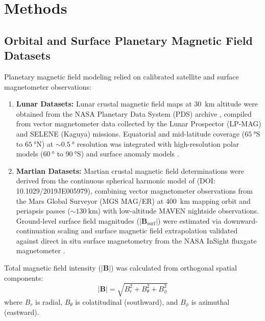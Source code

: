 \section{Methods}
\label{sec:methods}

\subsection{Orbital and Surface Planetary Magnetic Field Datasets}
Planetary magnetic field modeling relied on calibrated satellite and surface magnetometer observations:
\begin{enumerate}
    \item \textbf{Lunar Datasets:} Lunar crustal magnetic field maps at \SI{30}{\kilo\meter} altitude were obtained from the NASA Planetary Data System (PDS) archive \citep{Hood2020, Hood2022}, compiled from vector magnetometer data collected by the Lunar Prospector (LP-MAG) and SELENE (Kaguya) missions. Equatorial and mid-latitude coverage ($\SI{65}{\degree}\text{S}$ to $\SI{65}{\degree}\text{N}$) at $\sim\SI{0.5}{\degree}$ resolution was integrated with high-resolution polar models ($\SI{60}{\degree}$ to $\SI{90}{\degree}\text{S}$) \citep{Hood2022} and surface anomaly models \citep{Tsunakawa2015}.
    \item \textbf{Martian Datasets:} Martian crustal magnetic field determinations were derived from the continuous spherical harmonic model of \citet{Langlais2019} (DOI: 10.1029/2019JE005979), combining vector magnetometer observations from the Mars Global Surveyor (MGS MAG/ER) at \SI{400}{\kilo\meter} mapping orbit and periapsis passes ($\sim\SI{130}{\kilo\meter}$) with low-altitude MAVEN nightside observations. Ground-level surface field magnitudes ($|\mathbf{B}_{\text{surf}}|$) were estimated via downward-continuation scaling and surface magnetic field extrapolation validated against direct in situ surface magnetometry from the NASA InSight fluxgate magnetometer \citep{Johnson2020}.
\end{enumerate}

Total magnetic field intensity ($|\mathbf{B}|$) was calculated from orthogonal spatial components:
\begin{equation}
|\mathbf{B}| = \sqrt{B_r^2 + B_\theta^2 + B_\phi^2}
\end{equation}
where $B_r$ is radial, $B_\theta$ is colatitudinal (southward), and $B_\phi$ is azimuthal (eastward).

